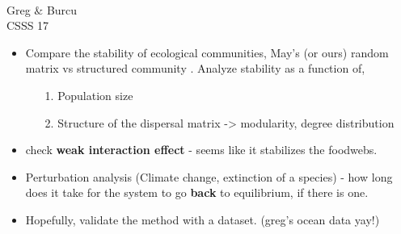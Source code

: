 \documentclass[12pt]{article}
\date{}
\begin{document}
\vspace*{0.2in}
\begin{flushleft}
{\Large
\textbf{} %
}
\newline
\\
Greg $\&$ Burcu
\\
\bigskip
CSSS 17
\\
\bigskip
\end{flushleft}

\begin{itemize}
\item Compare the stability of ecological communities, May's (or ours) random matrix vs structured community . Analyze stability as a function of,
\begin{itemize}
\item [1.] Population size 
\item [2.] Structure of the dispersal matrix -> modularity, degree distribution
\end{itemize}
\item check \textbf{weak interaction effect} - seems like it stabilizes the foodwebs.
\item Perturbation analysis (Climate change, extinction of a species) - how long does it take for the system to go \textbf{back} to equilibrium, if there is one. 
\item Hopefully, validate the method with a dataset. (greg's ocean data yay!)
\end{itemize}
\end{document}
